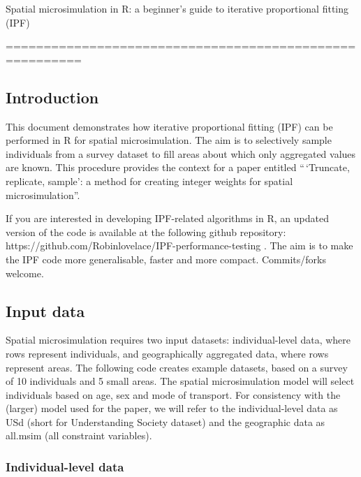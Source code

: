 Spatial microsimulation in R: a beginner's guide to iterative
proportional fitting (IPF)

========================================================

\subsection{Introduction}

This document demonstrates how iterative proportional fitting (IPF) can
be performed in R for spatial microsimulation. The aim is to selectively
sample individuals from a survey dataset to fill areas about which only
aggregated values are known. This procedure provides the context for a
paper entitled ``\,`Truncate, replicate, sample': a method for creating
integer weights for spatial microsimulation''.

If you are interested in developing IPF-related algorithms in R, an
updated version of the code is available at the following github
repository: https://github.com/Robinlovelace/IPF-performance-testing .
The aim is to make the IPF code more generalisable, faster and more
compact. Commits/forks welcome.

\subsection{Input data}

Spatial microsimulation requires two input datasets: individual-level
data, where rows represent individuals, and geographically aggregated
data, where rows represent areas. The following code creates example
datasets, based on a survey of 10 individuals and 5 small areas. The
spatial microsimulation model will select individuals based on age, sex
and mode of transport. For consistency with the (larger) model used for
the paper, we will refer to the individual-level data as USd (short for
Understanding Society dataset) and the geographic data as all.msim (all
constraint variables).

\subsubsection{Individual-level data}

